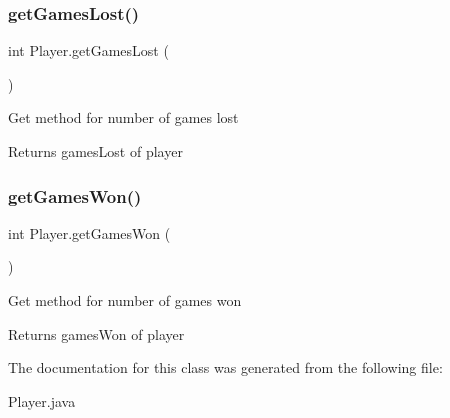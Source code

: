 \subsubsection{\texorpdfstring{getGamesLost()}{getGamesLost()}}
{\footnotesize\ttfamily int Player.\+get\+Games\+Lost (\begin{DoxyParamCaption}{ }\end{DoxyParamCaption})\hspace{0.3cm}{\ttfamily [inline]}}

Get method for number of games lost \begin{DoxyReturn}{Returns}
games\+Lost of player 
\end{DoxyReturn}
\mbox{\label{class_player_acf4f38580e99a50f903ce88cf3144e7a}} 
\subsubsection{\texorpdfstring{getGamesWon()}{getGamesWon()}}
{\footnotesize\ttfamily int Player.\+get\+Games\+Won (\begin{DoxyParamCaption}{ }\end{DoxyParamCaption})\hspace{0.3cm}{\ttfamily [inline]}}

Get method for number of games won \begin{DoxyReturn}{Returns}
games\+Won of player 
\end{DoxyReturn}


The documentation for this class was generated from the following file\+:\begin{DoxyCompactItemize}
\item 
Player.\+java\end{DoxyCompactItemize}
